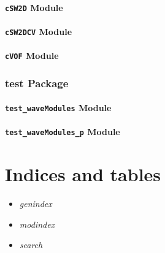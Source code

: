 \documentclass[letterpaper,12pt,english]{sphinxmanual}
\begin{document}
\subsubsection{\texttt{cSW2D} Module}
\label{api/src:csw2d-module}

\subsubsection{\texttt{cSW2DCV} Module}
\label{api/src:csw2dcv-module}

\subsubsection{\texttt{cVOF} Module}
\label{api/src:cvof-module}

\subsection{test Package}
\label{api/test::doc}\label{api/test:test-package}

\subsubsection{\texttt{test\_waveModules} Module}
\label{api/test:test-wavemodules-module}

\subsubsection{\texttt{test\_waveModules\_p} Module}
\label{api/test:test-wavemodules-p-module}

\chapter{Indices and tables}
\label{index:indices-and-tables}\begin{itemize}
\item {} 
\emph{genindex}

\item {} 
\emph{modindex}

\item {} 
\emph{search}

\end{itemize}



\renewcommand{\indexname}{Index}
\printindex
\end{document}

